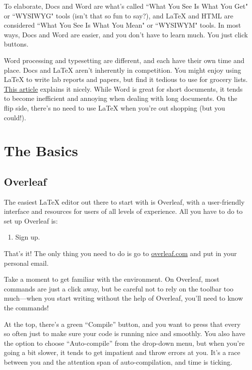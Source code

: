 \documentclass[letterpaper, 12pt]{article}
\begin{document}
To elaborate, Docs and Word are what's called ``What You See Is What You Get" or ``WYSIWYG" tools (isn't that so fun to say?), and \LaTeX{} and HTML are considered ``What You See Is What You Mean" or ``WYSIWYM" tools. In most ways, Docs and Word are easier, and you don't have to learn much. You just click buttons.

Word processing and typesetting are different, and each have their own time and place. Docs and \LaTeX{} aren't inherently in competition. You might enjoy using \LaTeX{} to write lab reports and papers, but find it tedious to use for grocery lists. \href{https://programmingforresearch.wordpress.com/2012/03/23/word-processor-versus-typesetter-2/}{This article} explains it nicely. While Word is great for short documents, it tends to become inefficient and annoying when dealing with long documents. On the flip side, there's no need to use \LaTeX{} when you're out shopping (but you could!).

\newpage

\section{The Basics}

\subsection{Overleaf}
The easiest \LaTeX{} editor out there to start with is Overleaf, with a user-friendly interface and resources for users of all levels of experience. All you have to do to set up Overleaf is:

\begin{enumerate}
    \item Sign up.
\end{enumerate}

That's it! The only thing you need to do is go to \href{overleaf.com}{overleaf.com} and put in your personal email.

Take a moment to get familiar with the environment. On Overleaf, most commands are just a click away, but be careful not to rely on the toolbar too much---when you start writing without the help of Overleaf, you'll need to know the commands!

At the top, there's a green ``Compile'' button, and you want to press that every so often just to make sure your code is running nice and smoothly. You also have the option to choose ``Auto-compile'' from the drop-down menu, but when you're going a bit slower, it tends to get impatient and throw errors at you. It's a race between you and the attention span of auto-compilation, and time is ticking.
\end{document}
